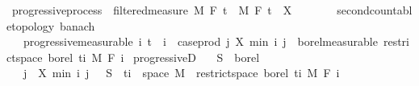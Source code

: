 \begin{isabellebody}
\endisatagproof
{\isafoldproof}%
%
\isadelimproof
%
\endisadelimproof
%
\isadelimdocument
%
\endisadelimdocument
%
\isatagdocument
%
\isamarkuptrue%
%
\endisatagdocument
{\isafolddocument}%
%
\isadelimdocument
%
\endisadelimdocument
{}\isamarkupfalse%
\ progressive{\isacharunderscore}{\kern0pt}process\ {\isacharequal}{\kern0pt}\ filtered{\isacharunderscore}{\kern0pt}measure\ M\ F\ t\ \ M\ F\ t\ \ X\ {\isacharcolon}{\kern0pt}{\isacharcolon}{\kern0pt}\ {\isachardoublequoteopen}{\isacharunderscore}{\kern0pt}\ {\isasymRightarrow}\ {\isacharunderscore}{\kern0pt}\ {\isasymRightarrow}\ {\isacharunderscore}{\kern0pt}\ {\isacharcolon}{\kern0pt}{\isacharcolon}{\kern0pt}\ {\isacharbraceleft}{\kern0pt}second{\isacharunderscore}{\kern0pt}countable{\isacharunderscore}{\kern0pt}topology{\isacharcomma}{\kern0pt}\ banach{\isacharbraceright}{\kern0pt}{\isachardoublequoteclose}\ {\isacharplus}{\kern0pt}\isanewline
\ \ \ progressive{\isacharbrackleft}{\kern0pt}measurable{\isacharbrackright}{\kern0pt}{\isacharcolon}{\kern0pt}\ {\isachardoublequoteopen}{\isasymAnd}i{\isachardot}{\kern0pt}\ t\ {\isasymle}\ i\ {\isasymLongrightarrow}\ case{\isacharunderscore}{\kern0pt}prod\ {\isacharparenleft}{\kern0pt}{\isasymlambda}j{\isachardot}{\kern0pt}\ X\ {\isacharparenleft}{\kern0pt}min\ i\ j{\isacharparenright}{\kern0pt}{\isacharparenright}{\kern0pt}\ {\isasymin}\ borel{\isacharunderscore}{\kern0pt}measurable\ {\isacharparenleft}{\kern0pt}restrict{\isacharunderscore}{\kern0pt}space\ borel\ {\isacharbraceleft}{\kern0pt}ti{\isacharbraceright}{\kern0pt}\ {\isasymOtimes}\isactrlsub M\ F\ i{\isacharparenright}{\kern0pt}{\isachardoublequoteclose}\isanewline
{}\isanewline
\isanewline
{}\isamarkupfalse%
\ progressiveD{\isacharcolon}{\kern0pt}\isanewline
\ \ \ {\isachardoublequoteopen}S\ {\isasymin}\ borel{\isachardoublequoteclose}\isanewline
\ \ \ {\isachardoublequoteopen}{\isacharparenleft}{\kern0pt}{\isasymlambda}{\isacharparenleft}{\kern0pt}j{\isacharcomma}{\kern0pt}\ {\isasymxi}{\isacharparenright}{\kern0pt}{\isachardot}{\kern0pt}\ X\ {\isacharparenleft}{\kern0pt}min\ i\ j{\isacharparenright}{\kern0pt}\ {\isasymxi}{\isacharparenright}{\kern0pt}\ {\isacharminus}{\kern0pt}{\isacharbackquote}{\kern0pt}\ S\ {\isasyminter}\ {\isacharparenleft}{\kern0pt}{\isacharbraceleft}{\kern0pt}ti{\isacharbraceright}{\kern0pt}\ {\isasymtimes}\ space\ M{\isacharparenright}{\kern0pt}\ {\isasymin}\ {\isacharparenleft}{\kern0pt}restrict{\isacharunderscore}{\kern0pt}space\ borel\ {\isacharbraceleft}{\kern0pt}ti{\isacharbraceright}{\kern0pt}\ {\isasymOtimes}\isactrlsub M\ F\ i{\isacharparenright}{\kern0pt}{\isachardoublequoteclose}\ \isanewline

\end{isabellebody}
